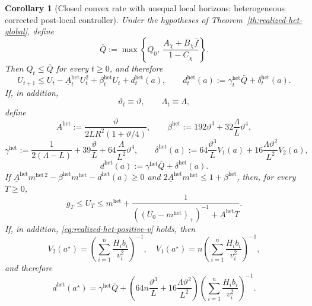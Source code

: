 \documentclass{article}
\newtheorem{corollary}[theorem]{Corollary}
\theoremstyle{definition}
\begin{document}
\begin{corollary}[Closed convex rate with unequal local horizons: heterogeneous corrected post-local controller]
\label{cor:realized-het-rate}
Under the hypotheses of Theorem~\ref{th:realized-het-global}, define
\[
\bar Q
:=
\max\left\{
Q_0,\
\frac{A_\chi+B_\chi\bar f}{1-C_\chi}
\right\}.
\]
Then $Q_t\le \bar Q$ for every $t\ge 0$, and therefore
\begin{equation}
U_{t+1}
\le
U_t-\underline A_t^{\mathrm{het}}U_t^2+\beta_t^{\mathrm{het}}U_t+d_t^{\mathrm{het}}(a),
\qquad
d_t^{\mathrm{het}}(a):=\gamma_t^{\mathrm{het}}\bar Q+\delta_t^{\mathrm{het}}(a).
\label{eq:realized-het-quadratic-linear}\end{equation}
If, in addition,
\begin{equation}
\vartheta_t\equiv \vartheta,
\qquad
\Lambda_t\equiv \Lambda,
\label{eq:realized-het-const-param}\end{equation}
define
\[
\underline A^{\mathrm{het}}
:=
\frac{\vartheta}{2LR^2(1+\vartheta/4)},
\qquad
\beta^{\mathrm{het}}
:=
192\vartheta^3+32\frac{\Lambda}{L}\vartheta^4,
\]
\begin{equation}
\gamma^{\mathrm{het}}
:=
\frac{1}{2(\Lambda-L)}
+
39\frac{\vartheta}{L}
+
64\frac{\Lambda}{L^2}\vartheta^4,
\qquad
\delta^{\mathrm{het}}(a)
:=
64\frac{\vartheta^3}{L}V_1(a)
+
16\frac{\Lambda\vartheta^2}{L^2}V_2(a),
\label{eq:realized-het-const-coeff-2}\end{equation}
\begin{equation}
d^{\mathrm{het}}(a):=\gamma^{\mathrm{het}}\bar Q+\delta^{\mathrm{het}}(a).
\label{eq:realized-het-const-coeff-3}\end{equation}
If $\underline A^{\mathrm{het}}m^{\mathrm{het}\,2}
-
\beta^{\mathrm{het}}m^{\mathrm{het}}
-
d^{\mathrm{het}}(a)
\ge 0$ and $2\underline A^{\mathrm{het}}m^{\mathrm{het}}\le 1+\beta^{\mathrm{het}}$,
then, for every $T\ge 0$,
\begin{equation}
g_T\le U_T
\le
m^{\mathrm{het}}
+
\frac{1}{((U_0-m^{\mathrm{het}})_+)^{-1}+\underline A^{\mathrm{het}}T}.
\label{eq:realized-het-rate}\end{equation}
If, in addition, \eqref{eq:realized-het-positive-v} holds, then
\[
V_2(a^\star)=\left(\sum_{i=1}^n \frac{H_i b_i}{v_i^2}\right)^{-1},
\quad
V_1(a^\star)=
n\left(\sum_{i=1}^n \frac{H_i b_i}{v_i^2}\right)^{-1},
\]
and therefore
\begin{equation}
d^{\mathrm{het}}(a^\star)
=
\gamma^{\mathrm{het}}\bar Q
+
\left(
64n\frac{\vartheta^3}{L}
+
16\frac{\Lambda\vartheta^2}{L^2}
\right)
\left(\sum_{i=1}^n \frac{H_i b_i}{v_i^2}\right)^{-1}.
\label{eq:realized-het-rate-astar}\end{equation}
\end{corollary}
\end{document}
